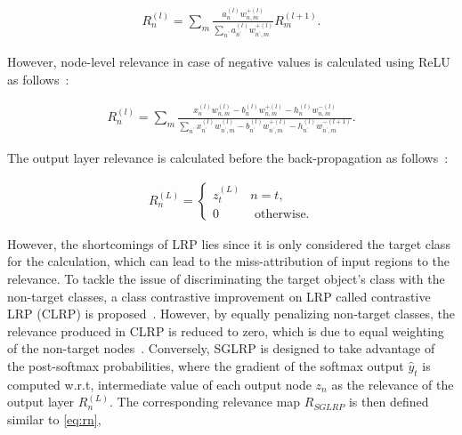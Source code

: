 \vspace{-2mm}
\begin{align}
    R_{n}^{(l)}=\sum_{m} \frac{a_{n}^{(l)} w_{n, m}^{+(l)}}{\sum_{n^{\prime}} a_{n^{\prime}}^{(l)} w_{n^{\prime}, m}^{+(l)}} R_{m}^{(l+1)}.
    \label{eq:rn}
\end{align}

However, node-level relevance in case of negative values is calculated using ReLU as follows~\cite{LRP2}:

\vspace{-2mm}
\begin{align}
    R_{n}^{(l)}=\sum_{m} \frac{x_{n}^{(l)} w_{n, m}^{(l)}-b_{n}^{(l)} w_{n, m}^{+(l)}-h_{n}^{(l)} w_{n, m}^{-(l)}}{\sum_{n^{\prime}} x_{n^{\prime}}^{(l)} w_{n^{\prime}, m}^{(l)}-b_{n^{\prime}}^{(l)} w_{n^{\prime}, m}^{+(l)}-h_{n^{\prime}}^{(l)} w_{n^{\prime}, m}^{-(l+1)}}.
    \label{eq:rn_neg}
\end{align}

The output layer relevance is calculated before the back-propagation as follows~\cite{LRP2}:

\vspace{-2mm}
\begin{align}
    R_{n}^{(L)}=\left\{\begin{array}{ll}
    {z_{t}^{(L)}} & {n=t}, \\
    {0} & {\text { otherwise.}}
    \end{array}\right.
    \label{eq:rn}
\end{align}

\hspace*{3.5mm} However, the shortcomings of LRP lies since it is only considered the target class for the calculation, which can lead to the miss-attribution of input regions to the relevance. To tackle the issue of discriminating the target object’s class with the non-target classes, a class contrastive improvement on LRP called contrastive LRP (CLRP) is proposed~\cite{LRP3}. However, by equally penalizing non-target classes, the relevance produced in CLRP is reduced to zero, which is due to equal weighting of the non-target nodes~\cite{ LRP2}. Conversely, SGLRP is designed to take advantage of the post-softmax probabilities, where the gradient of the softmax output $\hat{y}_{t}$ is computed w.r.t, intermediate value of each output node $z_{n}$ as the relevance of the output layer $R_{n}^{(L)}$. The corresponding relevance map $R_{SGLRP}$ is then defined similar to \cref{eq:rn},

